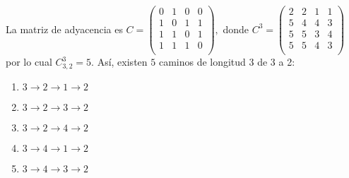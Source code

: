 \begin{prob}
\begin{enumerate}[a)]
\begin{myproof} La matriz de adyacencia es \(
C = \begin{pmatrix}
0 & 1 & 0 & 0 \\
1 & 0 & 1 & 1 \\
1 & 1 & 0 & 1 \\
1 & 1 & 1 & 0 \\
\end{pmatrix}
,\) donde \(C^3 = \begin{pmatrix}
2 & 2 & 1 & 1 \\
5 & 4 & 4 & 3 \\
5 & 5 & 3 & 4 \\
5 & 5 & 4 & 3 \\
\end{pmatrix}\) por lo cual $C^3_{3,2} = 5.$ Así, existen $5$ caminos de longitud 3 de 3 a 2:
\begin{enumerate}[1.]
\item $3 \to 2 \to 1 \to 2$
\item $3 \to 2 \to 3 \to 2$
\item $3 \to 2 \to 4 \to 2$
\item $3 \to 4 \to 1 \to 2$
\item $3 \to 4 \to 3 \to 2$
\end{enumerate}
\end{myproof}
\end{enumerate}
\end{prob}


